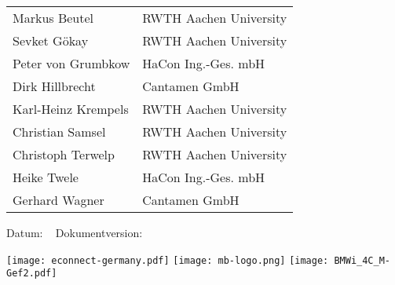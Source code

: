 \begin{titlepage}

\begin{huge}
\bfseries\center
\thistitle

\end{huge}

\vspace{1em}

\begin{large}
\bfseries\noindent
\begin{tabular}{@{}ll@{}}
  Markus Beutel & RWTH Aachen University \\
  Sevket Gökay & RWTH Aachen University \\
  Peter von Grumbkow & HaCon Ing.-Ges. mbH \\
  Dirk Hillbrecht & Cantamen GmbH \\
  Karl-Heinz Krempels & RWTH Aachen University \\
  Christian Samsel & RWTH Aachen University \\
  Christoph Terwelp & RWTH Aachen University \\
  Heike Twele & HaCon Ing.-Ges. mbH \\
  Gerhard Wagner & Cantamen GmbH \\
\end{tabular}


\end{large}

\vspace{2em}

Datum: \thisdate ~ Dokumentversion: \thisversion

\vspace{2em}

\thisabstract
\vspace{2em}
\vfill

\texttt{[image: econnect-germany.pdf]} \hspace{1.5em}
\texttt{[image: mb-logo.png]}
\hfill \texttt{[image: BMWi\_4C\_M-Gef2.pdf]}


\end{titlepage}
